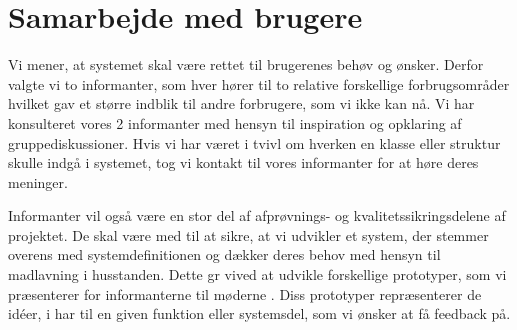 

\section{Samarbejde med brugere}
\label{sec:samarbejde}

Vi mener, at systemet skal være rettet til brugerenes behøv og ønsker. Derfor valgte vi to informanter, som hver hører til to relative forskellige forbrugsområder hvilket gav et større indblik til andre forbrugere, som vi ikke kan nå. Vi har konsulteret vores 2 informanter med hensyn til inspiration og opklaring af gruppediskussioner. Hvis vi har været i tvivl om hverken en klasse eller struktur skulle indgå i systemet, tog vi kontakt til vores informanter for at høre deres meninger.

Informanter vil også være en stor del af afprøvnings- og kvalitetssikringsdelene af projektet. De skal være med til at sikre, at vi udvikler et system, der stemmer overens med systemdefinitionen og dækker deres behov med hensyn til madlavning i husstanden. Dette gr vived at udvikle forskellige prototyper, som vi præsenterer for informanterne til møderne . Diss prototyper repræsenterer de id\'{e}er, i har til en given funktion eller systemsdel, som vi ønsker at få feedback på.
